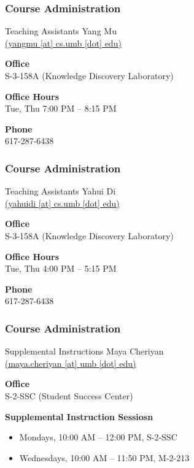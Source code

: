\documentclass[10pt, compress]{beamer}
\begin{document}
\begin{frame}[fragile]
	\frametitle{Course Administration}
	\begin{block}{Teaching Assistants}
		Yang Mu\\\href{mailto:yangmu@cs.umb.edu}{(yangmu [at] cs.umb [dot] edu)}

		\textbf{Office}\\S-3-158A (Knowledge Discovery Laboratory)

		\textbf{Office Hours}\\Tue, Thu 7:00 PM -- 8:15 PM

		\textbf{Phone}\\617-287-6438
	\end{block}
\end{frame}

\begin{frame}[fragile]
	\frametitle{Course Administration}
	\begin{block}{Teaching Assistants}
		Yahui Di\\\href{mailto:yahuidi@cs.umb.edu}{(yahuidi [at] cs.umb [dot] edu)}

		\textbf{Office}\\S-3-158A (Knowledge Discovery Laboratory)

		\textbf{Office Hours}\\Tue, Thu 4:00 PM -- 5:15 PM

		\textbf{Phone}\\617-287-6438
	\end{block}
\end{frame}

\begin{frame}[fragile]
	\frametitle{Course Administration}
	\begin{block}{Supplemental Instructions}
		Maya Cheriyan\\\href{mailto:maya.cheriyan001@umb.edu}{(maya.cheriyan [at] umb [dot] edu)}

		\textbf{Office}\\S-2-SSC (Student Success Center)

		\textbf{Supplemental Instruction Sessiosn}
		\begin{itemize}
			\item[] Mondays, 10:00 AM -- 12:00 PM, S-2-SSC
			\item[] Wednesdays, 10:00 AM -- 11:50 PM, M-2-213
		\end{itemize}
	\end{block}
\end{frame}
\end{document}
